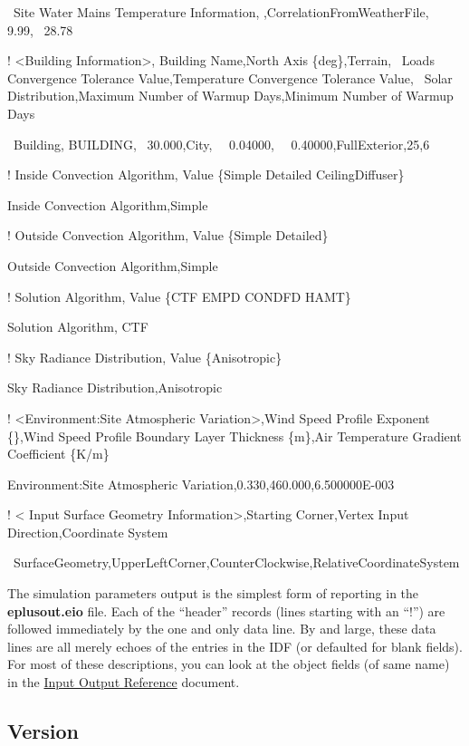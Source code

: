 ~Site Water Mains Temperature Information, ,CorrelationFromWeatherFile,~ 9.99,~ 28.78

! \textless{}Building Information\textgreater{}, Building Name,North Axis \{deg\},Terrain,~ Loads Convergence Tolerance Value,Temperature Convergence Tolerance Value,~ Solar Distribution,Maximum Number of Warmup Days,Minimum Number of Warmup Days

~Building, BUILDING,~ 30.000,City,~~ 0.04000,~~ 0.40000,FullExterior,25,6

! Inside Convection Algorithm, Value \{Simple \textbar{} Detailed \textbar{} CeilingDiffuser\}

Inside Convection Algorithm,Simple

! Outside Convection Algorithm, Value \{Simple \textbar{} Detailed\}

Outside Convection Algorithm,Simple

! Solution Algorithm, Value \{CTF \textbar{} EMPD \textbar{} CONDFD \textbar{} HAMT\}

Solution Algorithm, CTF

! Sky Radiance Distribution, Value \{Anisotropic\}

Sky Radiance Distribution,Anisotropic

! \textless{}Environment:Site Atmospheric Variation\textgreater{},Wind Speed Profile Exponent \{\},Wind Speed Profile Boundary Layer Thickness \{m\},Air Temperature Gradient Coefficient \{K/m\}

Environment:Site Atmospheric Variation,0.330,460.000,6.500000E-003

! \textless{} Input Surface Geometry Information\textgreater{},Starting Corner,Vertex Input Direction,Coordinate System

~SurfaceGeometry,UpperLeftCorner,CounterClockwise,RelativeCoordinateSystem

The simulation parameters output is the simplest form of reporting in the \textbf{eplusout.eio} file. Each of the ``header'' records (lines starting with an ``!'') are followed immediately by the one and only data line. By and large, these data lines are all merely echoes of the entries in the IDF (or defaulted for blank fields). For most of these descriptions, you can look at the object fields (of same name) in the \href{file:///E:/Docs4PDFs/InputOutputReference.pdf}{Input Output Reference} document.

\subsection{Version}\label{version}

